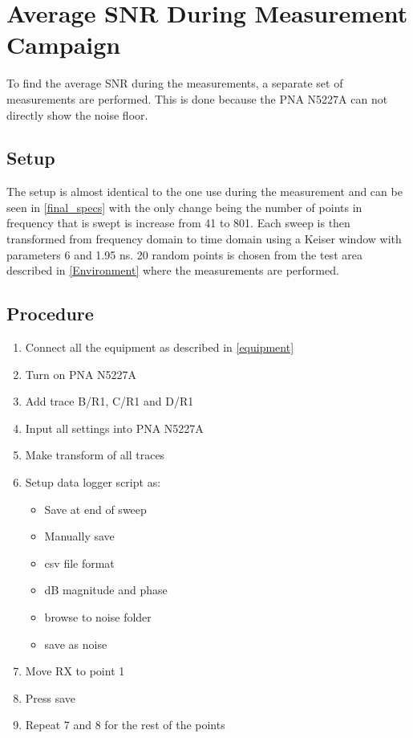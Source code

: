 \section{Average SNR During Measurement Campaign}
\label{app:SNR}

To find the average SNR during the measurements, a separate set of measurements are performed. This is done because the PNA N5227A can not directly show the noise floor. 

\subsection{Setup}
The setup is almost identical to the one use during the measurement and can be seen in \autoref{final_specs} with the only change being the number of points in frequency that is swept is increase from 41 to 801. Each sweep is then transformed from frequency domain to time domain using a Keiser window with parameters 6 and 1.95 ns. 20 random points is chosen from the test area described in \autoref{Environment} where the measurements are performed. 

\subsection{Procedure}
\begin{enumerate}
	\item Connect all the equipment as described in \autoref{equipment}
	\item Turn on PNA N5227A
	\item Add trace B/R1, C/R1 and D/R1  
	\item Input all settings into PNA N5227A
	\item Make transform of all traces
	\item Setup data logger script as:
	\begin{itemize}
		\item Save at end of sweep
		\item Manually save
		\item csv file format
		\item dB magnitude and phase
		\item browse to noise folder
		\item save as noise
	\end{itemize}
	\item Move RX to point 1
	\item Press save
	\item Repeat 7 and 8 for the rest of the points	
\end{enumerate}


